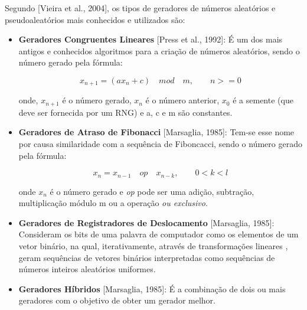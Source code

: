 \documentclass[a4paper, 12pt, english]{article}
\begin{document}
Segundo [Vieira et al., 2004], os tipos de geradores de números aleatórios e pseudoaleatórios
mais conhecidos e utilizados são:

\begin{itemize}

\item \textbf{Geradores Congruentes Lineares} [Press et al., 1992]: É um dos mais antigos e conhecidos
algoritmos para a criação de números aleatórios, sendo o número gerado pela fórmula:

\begin{equation}
	x_{n+1} = (ax_{n} + c) \quad \textit{mod} \quad  m, \qquad n >= 0
\end{equation}

onde, \begin{math} x_{n+1} \end{math} é o número gerado, \begin{math} x_{n} \end{math} é o número anterior, \begin{math} x_{0} \end{math} é a semente (que deve ser
fornecida por um RNG) e a, c e m são constantes.

\item \textbf{Geradores de Atraso de Fibonacci} [Marsaglia, 1985]: Tem-se esse nome por causa
similaridade com a sequência de Fiboncacci, sendo o número gerado pela fórmula:

\begin{equation}
x_{n} = x_{n-1} \quad op \quad x_{n-k}, \qquad 0<k<l
\end{equation}

onde \begin{math} x _{n} \end{math} é o número gerado e \textit{op} pode ser uma adição, subtração, multiplicação módulo m ou a operação \textit{ou exclusivo}.

\item \textbf{Geradores de Registradores de Deslocamento} [Marsaglia, 1985]: Consideram os bits
de uma palavra de computador como os elementos de um vetor binário, na qual,
iterativamente, através de transformações lineares
, geram sequências de vetores
binários interpretadas como sequências de números inteiros aleatórios uniformes.

\item \textbf{Geradores Híbridos} [Marsaglia, 1985]: É a combinação de dois ou mais geradores
com o objetivo de obter um gerador melhor.

\end{itemize}
\end{document}
